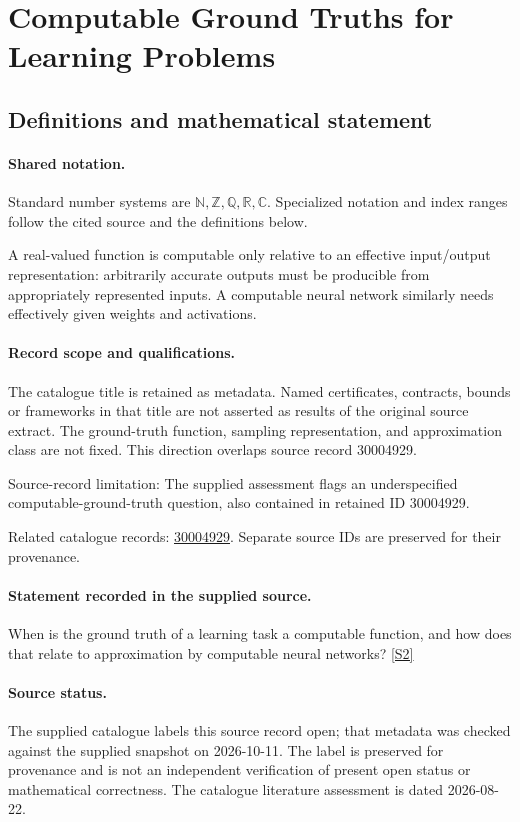 \documentclass[11pt]{article}
\newcommand{\sref}[2]{\hyperlink{source:#1:#2}{[S#2]}}
\begin{document}
\section{Computable Ground Truths for Learning Problems}\label{statement}

\subsection{Definitions and mathematical statement}

\paragraph{Shared notation.}Standard number systems are $\mathbb N,\mathbb Z,\mathbb Q,\mathbb R,\mathbb C$. Specialized notation and index ranges follow the cited source and the definitions below.


A real-valued function is computable only relative to an effective input/output representation: arbitrarily accurate outputs must be producible from appropriately represented inputs. A computable neural network similarly needs effectively given weights and activations.
\paragraph{Record scope and qualifications.}
The catalogue title is retained as metadata. Named certificates, contracts, bounds or frameworks in that title are not asserted as results of the original source extract.
The ground-truth function, sampling representation, and approximation class are not fixed. This direction overlaps source record 30004929.

Source-record limitation: The supplied assessment flags an underspecified computable-ground-truth question, also contained in retained ID 30004929.

Related catalogue records: \href{https://mehmetmars7.github.io/Erdosproblems-llm-hunter/problem.html?type=open_problems&id=30004929}{30004929}. Separate source IDs are preserved for their provenance.
\paragraph{Statement recorded in the supplied source.}
When is the ground truth of a learning task a computable function, and how does that relate to approximation by computable neural networks? \sref{statement}{2}
\paragraph{Source status.}
The supplied catalogue labels this source record open; that metadata was checked against the supplied snapshot on 2026-10-11. The label is preserved for provenance and is not an independent verification of present open status or mathematical correctness. The catalogue literature assessment is dated 2026-08-22.
\end{document}
